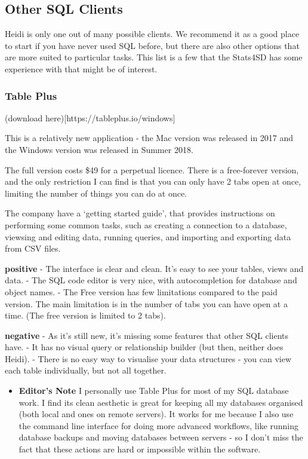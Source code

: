 \documentclass[]{article}
\date{}
\providecommand{\tightlist}{%
  \setlength{\itemsep}{0pt}\setlength{\parskip}{0pt}}
\begin{document}
\hypertarget{other-sql-clients}{%
\subsection{Other SQL Clients}\label{other-sql-clients}}

Heidi is only one out of many possible clients. We recommend it as a
good place to start if you have never used SQL before, but there are
also other options that are more suited to particular tasks. This list
is a few that the Stats4SD has some experience with that might be of
interest.

\hypertarget{table-plus}{%
\subsubsection{Table Plus}\label{table-plus}}

(download here){[}https://tableplus.io/windows{]}

This is a relatively new application - the Mac version was released in
2017 and the Windows version was released in Summer 2018.

The full version costs \$49 for a perpetual licence. There is a
free-forever version, and the only restriction I can find is that you
can only have 2 tabs open at once, limiting the number of things you can
do at once.

The company have a `getting started guide', that provides instructions
on performing some common tasks, such as creating a connection to a
database, viewsing and editing data, running queries, and importing and
exporting data from CSV files.

\textbf{positive} - The interface is clear and clean. It's easy to see
your tables, views and data. - The SQL code editor is very nice, with
autocompletion for database and object names. - The Free version has few
limitations compared to the paid version. The main limitation is in the
number of tabs you can have open at a time. (The free version is limited
to 2 tabs).

\textbf{negative} - As it's still new, it's missing some features that
other SQL clients have. - It has no visual query or relationship builder
(but then, neither does Heidi). - There is no easy way to visualise your
data structures - you can view each table individually, but not all
together.

\begin{itemize}
\tightlist
\item
  \textbf{Editor's Note} I personally use Table Plus for most of my SQL
  database work. I find its clean aesthetic is great for keeping all my
  databases organised (both local and ones on remote servers). It works
  for me because I also use the command line interface for doing more
  advanced workflows, like running database backups and moving databases
  between servers - so I don't miss the fact that these actions are hard
  or impossible within the software.
\end{itemize}
\end{document}

